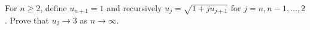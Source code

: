 For $n\ge2$, define $u_{n+1}=1$ and recursively $u_j=\sqrt{1+j u_{j+1}}$ for $j=n,n-1,\ldots,2$. Prove that $u_2\to3$ as $n\to\infty$.
